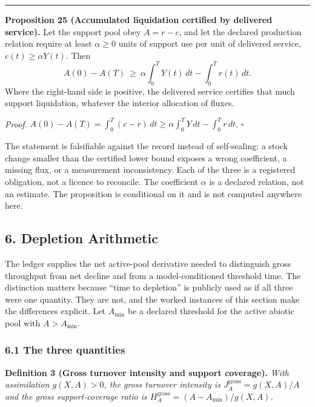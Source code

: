 \documentclass[11pt]{article}
\begin{document}
\begin{center}\rule{0.5\linewidth}{0.5pt}\end{center}

\textbf{Proposition 25 (Accumulated liquidation certified by delivered service).} Let the support pool
obey \(\dot A=r-c\), and let the declared production relation require at least \(\alpha\ge0\) units
of support use per unit of delivered service, \(c(t)\ge\alpha Y(t)\). Then
\[ A(0)-A(T)\ \ge\ \alpha\int_0^TY(t)\,dt-\int_0^Tr(t)\,dt . \]
Where the right-hand side is positive, the delivered service certifies that much support liquidation,
whatever the interior allocation of fluxes.

\emph{Proof.} \(A(0)-A(T)=\int_0^T(c-r)\,dt\ge\alpha\int_0^TY\,dt-\int_0^Tr\,dt\). \ensuremath{\square}

The statement is falsifiable against the record instead of self-sealing: a stock change smaller than the certified lower bound exposes a wrong coefficient, a missing flux, or a measurement inconsistency. Each of the three is a registered obligation, not a licence to reconcile. The coefficient \(\alpha\) is a declared relation, not an estimate. The proposition is conditional on it and is not computed anywhere here.


\subsection{6. Depletion Arithmetic}\label{depletion-arithmetic}

The ledger supplies the net active-pool derivative needed to distinguish
gross throughput from net decline and from a model-conditioned threshold
time. The distinction matters because ``time to depletion'' is publicly
used as if all three were one quantity. They are not, and the worked
instances of this section make the differences explicit. Let
\(A_{\min}\) be a declared threshold for the active abiotic pool with
\(A > A_{\min}\).

\subsubsection{6.1 The three quantities}\label{the-three-quantities}

\textbf{Definition 3 (Gross turnover intensity and support coverage).}
\emph{With assimilation \(g(X,A) > 0\), the gross turnover intensity is
\(J_A^{\mathrm{gross}} = g(X,A)/A\) and the gross support-coverage ratio
is \(H_A^{\mathrm{gross}} = (A - A_{\min})/g(X,A)\).}
\end{document}
